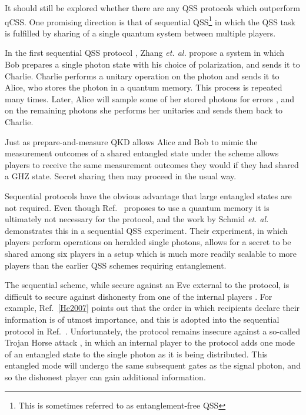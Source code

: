 It should still be explored whether there are any QSS protocols which outperform qCSS. One promising direction is that of sequential QSS\footnote{This is sometimes referred to as entanglement-free QSS} in which the QSS task is fulfilled by sharing of a single quantum system between multiple players.

In the first sequential QSS protocol \cite{Zhang2005}, Zhang \emph{et. al.} propose a system in which Bob prepares a single photon state with his choice of polarization, and sends it to Charlie. Charlie performs a unitary operation  on the photon and sends it to Alice, who stores the photon in a quantum memory. This process is repeated many times. Later, Alice will sample some of her stored photons for errors , and on the remaining photons she performs her unitaries  and sends them back to Charlie. 

Just as prepare-and-measure QKD allows Alice and Bob to mimic the measurement outcomes of a shared entangled state  under  the scheme \cite{Zhang2005} allows players to receive the same measurement outcomes they would if they had shared a GHZ state. Secret sharing then may proceed in the usual way. 

Sequential protocols have the obvious advantage that large entangled states are not required. Even though Ref.~\cite{Zhang2005} proposes to use a quantum memory it is ultimately not necessary for the protocol, and the work by Schmid \emph{et. al.} demonstrates this \cite{Schmid2005} in a sequential QSS experiment. Their experiment, in which players perform operations on heralded single photons, allows for a secret to be shared among six players in a setup which is much more readily scalable to more players than the earlier QSS schemes requiring entanglement.

The sequential scheme, while secure against an Eve external to the protocol, is difficult to secure against dishonesty from one of the internal players \cite{Deng2005, Qin2006, He2007}. For example, Ref.~\ref{He2007} points out that the order in which recipients declare their information is of utmost importance, and this is adopted into the sequential protocol in Ref.~\cite{Schmid2007}. Unfortunately, the protocol remains insecure against a so-called Trojan Horse attack \cite{Deng2005}, in which an internal player to the protocol adds one mode of an entangled state to the single photon as it is being distributed. This entangled mode will undergo the same subsequent gates as the signal photon, and so the dishonest player can gain additional information. 

